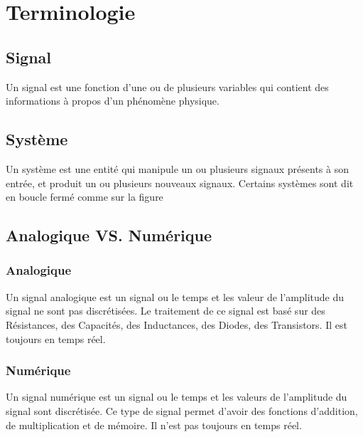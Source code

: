 
	\tableofcontents
\chapter{Terminologie}
\section{Signal}
Un signal est une fonction d'une ou de plusieurs variables qui contient des informations à propos d'un phénomène physique.
\section{Système}
Un système est une entité qui manipule un ou plusieurs signaux présents à son entrée, et produit un ou plusieurs nouveaux signaux. Certains systèmes sont dit en boucle fermé comme sur la figure
\section{Analogique VS. Numérique}
\subsection{Analogique}
Un signal analogique est un signal ou le temps et les valeur de l'amplitude du signal ne sont pas discrétisées. Le traitement de ce signal est basé sur des Résistances, des Capacités, des Inductances, des Diodes, des Transistors. Il est toujours en temps réel.
\subsection{Numérique}
Un signal numérique  est un signal ou le temps et les valeurs de l'amplitude du signal sont discrétisée. Ce type de signal permet d'avoir des fonctions d'addition, de multiplication et de mémoire. Il n'est pas toujours en temps réel.


